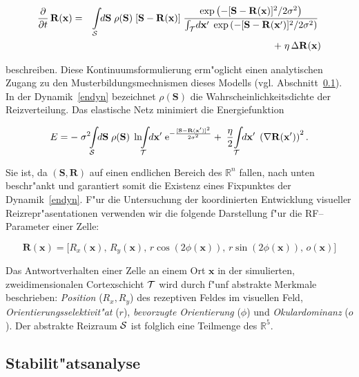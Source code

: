 \begin{eqnarray}
\frac{\partial}{\partial t}\, \mathbf{R(x)} &=&\int\limits_{\cal
S}\!\!d\mathbf{S}\; \rho(\mathbf{S})\; [\mathbf{S-R(x)}]\;
\frac{\exp\left(-[\mathbf{S-R(x)}]^2/2\sigma^2\right)}{\int_{\cal T} 
\!d\mathbf{x}^\prime\; \exp\left(-[\mathbf{S-R(\mathbf{x}^\prime)}]^2/2\sigma^2\right)}\;\nonumber\\
&&+\;\eta\,\Delta\mathbf{R(x)}
\label{endyn}
\end{eqnarray}

beschreiben. Diese Kontinuumsformulierung erm"oglicht einen analytischen
Zugang zu den Musterbildungsmechnismen dieses Modells
(vgl. Abschnitt~\ref{stabilitaet}).  In der Dynamik~\eqref{endyn}
bezeichnet $\rho(\mathbf{S})$ die Wahrscheinlichkeitsdichte der
Reizverteilung. Das elastische Netz minimiert die Energiefunktion

\begin{equation}
E=-\; \sigma^2\!\!\int\limits_{\cal S}\!\!d\mathbf{S}\; \rho(\mathbf{S})\;
\ln\!\!\int\limits_{\cal T}\!\!d\mathbf{x}^\prime\;
\text{e}^{-\frac{[\mathbf{S-R(\mathbf{x}^\prime)}]^2}{2\sigma^2}}+\;
\frac{\eta}{2}\!\int\limits_{\cal T}\!\!d\mathbf{x}^\prime\;
\left(\nabla\mathbf{R(\mathbf{x}^\prime)}\right)^2.
\label{energie}
\end{equation}

Sie ist, da $(\mathbf{S,R})$ auf einen endlichen Bereich des $\mathbb{R}^n$
fallen, nach unten beschr"ankt und garantiert somit die Existenz eines
Fixpunktes der Dynamik~\eqref{endyn}.  F"ur die Untersuchung der
koordinierten Entwicklung visueller Reizrepr"asentationen verwenden wir die
folgende Darstellung f"ur die RF--Parameter einer Zelle:

\begin{equation*}
\mathbf{R(x)} = \bigl[R_x(\mathbf{x}),\, R_y(\mathbf{x}),\,
r\cos(2\phi(\mathbf{x})),\, r\sin(2\phi(\mathbf{x})),\, o(\mathbf{x})\bigr]
\end{equation*}

Das Antwortverhalten einer Zelle an einem Ort $\mathbf{x}$ in der
simulierten, zweidimensionalen Cortexschicht $\cal T$ wird durch
f"unf abstrakte Merkmale beschrieben: \emph{Position} ($R_x,R_y$) des
rezeptiven Feldes im visuellen Feld, \emph{Orientierungsselektivit"at}
($r$), \emph{bevorzugte Orientierung} ($\phi$) und \emph{Okulardominanz}
($o$).  Der abstrakte Reizraum ${\cal S}$ ist folglich eine Teilmenge
des $\mathbb{R}^5$.

\subsection{Stabilit"atsanalyse}
\label{stabilitaet}

